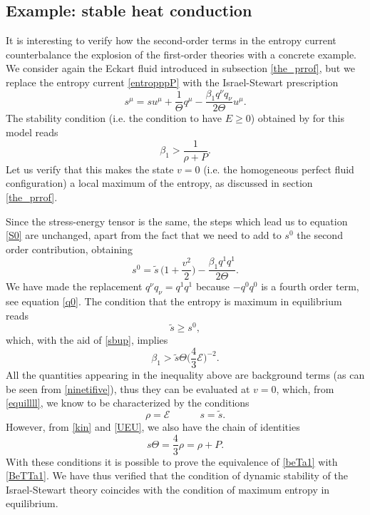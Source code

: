 \documentclass[a4paper, amsfonts, amssymb, amsmath, reprint, showkeys, nofootinbib, twoside]{revtex4-1}
\newcommand{\spc}{\quad \quad \quad}
\begin{document}
\subsection{Example: stable heat conduction}

It is interesting to verify how the second-order terms in the entropy current counterbalance the explosion of the first-order theories with a concrete example. We consider again the Eckart fluid  introduced in subsection \ref{the_prrof}, but we replace the entropy current \eqref{entropppP} with the Israel-Stewart prescription
\begin{equation}\label{zszswew}
s^\mu = su^\mu + \dfrac{1}{\Theta} q^\mu - \dfrac{\beta_1 q^\nu q_\nu}{2\Theta}  u^\mu .
\end{equation}
The stability condition (i.e. the condition to have $E \geq 0$) obtained by \cite{Hishcock1983} for this model reads
\begin{equation}\label{BeTTa1}
\beta_1 > \dfrac{1}{\rho +P}.
\end{equation}
Let us verify that this makes the state $v=0$ (i.e. the homogeneous perfect fluid configuration) a local maximum of the entropy, as discussed in section \ref{the_prrof}.

Since the stress-energy tensor is the same, the steps which lead us to equation \eqref{S0} are unchanged, apart from the fact that we need to add to $s^0$ the second order contribution, obtaining
\begin{equation}\label{ninetifive}
s^0 = \tilde{s} \, \bigg( 1+ \dfrac{v^2}{2} \bigg)- \dfrac{\beta_1 q^1 q^1}{2\Theta}  .
\end{equation}
We have made the replacement $q^\nu q_\nu = q^1 q^1$ because $-q^0 q^0$ is a fourth order term, see equation \eqref{q0}. The condition that the entropy is maximum in equilibrium reads
\begin{equation}
\tilde{s} \geq s^0,
\end{equation}
which, with the aid of \eqref{sbup}, implies
\begin{equation}\label{beTa1}
\beta_1 > \tilde{s}\Theta \bigg(\dfrac{4}{3} \mathcal{E} \bigg)^{-2}.
\end{equation}
All the quantities appearing in the inequality above are background terms (as can be seen from \eqref{ninetifive}), thus they can be evaluated at $v=0$, which, from \eqref{equillll}, we know to be characterized by the conditions 
\begin{equation}
\rho = \mathcal{E} \spc s= \tilde{s} .
\end{equation}
However, from \eqref{kin} and \eqref{UEU}, we also have the chain of identities
\begin{equation}
s\Theta = \dfrac{4}{3} \rho = \rho +P.
\end{equation}
With these conditions it is possible to prove the equivalence of \eqref{beTa1} with \eqref{BeTTa1}. We have thus verified that the condition of dynamic stability of the Israel-Stewart theory coincides with the condition of maximum entropy in equilibrium.
\end{document}

